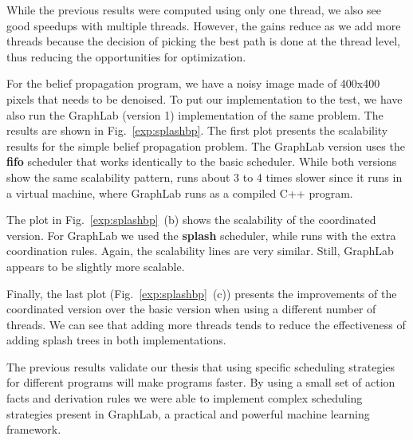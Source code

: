 While the previous results were computed using only one thread, we also see good speedups with multiple threads. However, the gains reduce as we add
more threads because the decision of picking the best path is done at the thread level, thus reducing the opportunities for optimization.

For the belief propagation program, we have a noisy image made of 400x400 pixels that needs to be denoised.
To put our implementation to the test, we have also run the GraphLab (version 1) implementation of the same problem. The results are shown
in Fig.~\ref{exp:splashbp}. The first plot presents the scalability results for the simple belief propagation problem. The GraphLab version
uses the \textbf{fifo} scheduler that works identically to the basic \lang scheduler. While both versions show the same scalability pattern,
\lang runs about 3 to 4 times slower since it runs in a virtual machine, where GraphLab runs as a compiled C++ program.

\begin{figure*}[ht]
   \centering
   \caption{Experimental results for belief propagation with coordination using splashes. The dataset is a 400x400 image.}
   \label{exp:splashbp}
\end{figure*}

The plot in Fig.~\ref{exp:splashbp}~(b) shows the scalability of the coordinated version. For GraphLab we used the \textbf{splash} scheduler, while \lang
runs with the extra coordination rules. Again, the scalability lines are very similar. Still, GraphLab appears to be slightly more scalable.

Finally, the last plot (Fig.~\ref{exp:splashbp}~(c)) presents the improvements of the coordinated version over the basic version when using a different
number of threads. We can see that adding more threads tends to reduce the effectiveness of adding splash trees in both implementations.

The previous results validate our thesis that using specific scheduling strategies for different programs will make programs faster. By using a small set
of action facts and derivation rules we were able to implement complex scheduling strategies present in GraphLab, a practical and powerful machine learning
framework.

